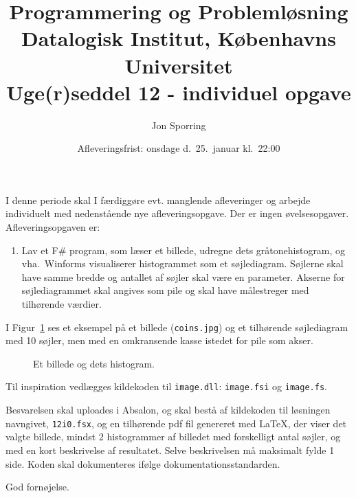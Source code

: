\documentclass[a4paper,12pt]{article}
\title{Programmering og Problemløsning\\Datalogisk Institut,
  Københavns Universitet\\Uge(r)seddel 12 - individuel opgave}
\author{Jon Sporring}
\date{Afleveringsfrist: onsdage d.\  25.\ januar kl.\ 22:00}
\begin{document}
\maketitle

I denne periode skal I færdiggøre evt. manglende afleveringer og arbejde individuelt med nedenstående nye afleveringsopgave. Der er ingen øvelsesopgaver. Afleveringsopgaven er:

\begin{enumerate}[label=12i.\arabic*,start=0]
\item Lav et F\# program, som læser et billede, udregne dets gråtonehistogram, og vha.\ Winforms visualiserer histogrammet som et søjlediagram. Søjlerne skal have samme bredde og antallet af søjler skal være en parameter. Akserne for søjlediagrammet skal angives som pile og skal have målestreger med tilhørende værdier.
\end{enumerate}
I Figur~\ref{fig:coin} ses et eksempel på et billede (\lstinline!coins.jpg!) og et tilhørende søjlediagram med 10 søjler, men med en omkransende kasse istedet for pile som akser.
\begin{figure}
  \centering
  \caption{Et billede og dets histogram.}
  \label{fig:coin}
\end{figure}
Til inspiration vedlægges kildekoden til \lstinline!image.dll!: \lstinline!image.fsi! og \lstinline!image.fs!.

Besvarelsen skal uploades i Absalon, og skal bestå af kildekoden til løsningen navngivet, \lstinline!12i0.fsx!, og en tilhørende pdf fil genereret med LaTeX, der viser det valgte billede, mindst 2 histogrammer af billedet med forskelligt antal søjler, og med en kort beskrivelse af resultatet. Selve beskrivelsen må maksimalt fylde 1 side. Koden skal dokumenteres ifølge dokumentationsstandarden.

\flushright God fornøjelse.
\end{document}
